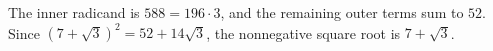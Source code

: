 The inner radicand is $588=196\cdot3$, and the remaining outer terms sum to $52$. Since $(7+\sqrt3)^2=52+14\sqrt3$, the nonnegative square root is $\boxed{7+\sqrt3}$.
